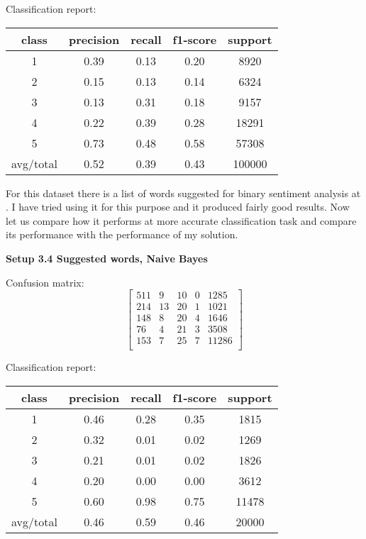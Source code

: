 \documentclass[12pt]{report}
\begin{document}
Classification report:

\begin{center}
	\begin{tabular}{c | c | c | c | c }
		\hline
		class & precision & recall & f1-score & support \\ \hline
		1 & 0.39 & 0.13 & 0.20 & 8920 \\ \hline
		2 & 0.15 & 0.13 & 0.14 & 6324 \\ \hline
		3 & 0.13 & 0.31 & 0.18 & 9157 \\ \hline
		4 & 0.22 & 0.39 & 0.28 & 18291 \\ \hline
		5 & 0.73 & 0.48 & 0.58 & 57308 \\ \hline
		avg/total & 0.52 & 0.39 & 0.43 & 100000 \\ \hline
	\end{tabular}
\end{center}


For this dataset there is a list of words suggested for binary sentiment analysis at \cite{important-words}. I have tried using it for this purpose and it produced fairly good results. Now let us compare how it performs at more accurate classification task and compare its performance with the performance of my solution.

\bigbreak

\textbf{Setup 3.4 Suggested words, Naive Bayes}

Confusion matrix:
\[
\begin{bmatrix}
511 & 9 & 10 & 0 & 1285 \\
214 & 13 & 20 & 1 & 1021 \\
148 & 8 & 20 & 4 & 1646 \\
76 & 4 & 21 & 3 & 3508 \\
153 & 7 & 25 & 7 & 11286 \\
\end{bmatrix}
\]

Classification report:

\begin{center}
	\begin{tabular}{c | c | c | c | c }
		\hline
		class & precision & recall & f1-score & support \\ \hline
		1 & 0.46 & 0.28 & 0.35 & 1815 \\ \hline
		2 & 0.32 & 0.01 & 0.02 & 1269 \\ \hline
		3 & 0.21 & 0.01 & 0.02 & 1826 \\ \hline
		4 & 0.20 & 0.00 & 0.00 & 3612 \\ \hline
		5 & 0.60 & 0.98 & 0.75 & 11478 \\ \hline
		avg/total & 0.46 & 0.59 & 0.46 & 20000 \\ \hline
	\end{tabular}
\end{center}
\end{document}

